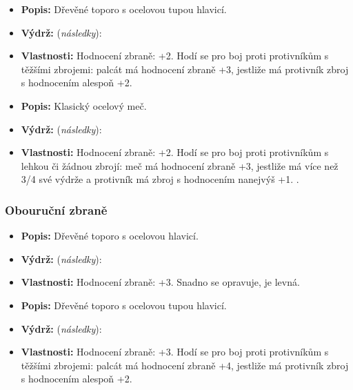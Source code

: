 \documentclass[../main.tex]{subfiles}
\begin{document}
\begin{Predmet}[Palcát]
\begin{itemize}
	\item \textbf{Popis:} Dřevěné toporo s ocelovou tupou hlavicí.
	\item \textbf{Výdrž:} (\emph{následky}): 
	\item \textbf{Vlastnosti:} Hodnocení zbraně: +2. Hodí se pro boj proti protivníkům s těžšími zbrojemi: palcát má hodnocení zbraně +3, jestliže má protivník zbroj s hodnocením alespoň +2.
\end{itemize}
\end{Predmet}

\begin{Predmet}[Meč]
\begin{itemize}
		\item \textbf{Popis:} Klasický ocelový meč. \leavevmode{}
		\item \textbf{Výdrž:} (\emph{následky}): 
		\item \textbf{Vlastnosti:} Hodnocení zbraně: +2. Hodí se pro boj proti protivníkům s lehkou či žádnou zbrojí: meč má hodnocení zbraně +3, jestliže má více než 3/4 své výdrže a protivník má zbroj s hodnocením nanejvýš +1. \leavevmode{}. 
	\end{itemize}
	\end{Predmet}

	\subsubsection{Obouruční zbraně}
	\label{sec:zbrane_treti}

	\begin{Predmet}
	\begin{itemize}
		\item \textbf{Popis:} Dřevěné toporo s ocelovou hlavicí.
		\item \textbf{Výdrž:} (\emph{následky}): 
		\item \textbf{Vlastnosti:} Hodnocení zbraně: +3. Snadno se opravuje, je levná.
	\end{itemize}
	\end{Predmet}

	\begin{Predmet}
	\begin{itemize}
		\item \textbf{Popis:} Dřevěné toporo s ocelovou tupou hlavicí.
		\item \textbf{Výdrž:} (\emph{následky}): 
		\item \textbf{Vlastnosti:} Hodnocení zbraně: +3. Hodí se pro boj proti protivníkům s těžšími zbrojemi: palcát má hodnocení zbraně +4, jestliže má protivník zbroj s hodnocením alespoň +2.
	\end{itemize}
	\end{Predmet}
\end{document}
